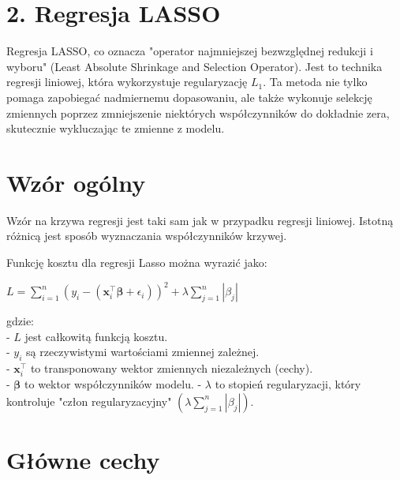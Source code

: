 {}
\justify
\fontsize{14}{16}\selectfont
\setlength{\parindent}{0pt}
\section*{2. Regresja LASSO \cite{alma991000280759708832}}
\fontsize{12}{14}\selectfont
\vspace{-1.0em}

Regresja LASSO, co oznacza "operator najmniejszej bezwzględnej redukcji i wyboru" (Least Absolute Shrinkage and Selection Operator). Jest to technika regresji liniowej, która wykorzystuje regularyzację $L_1$. Ta metoda nie tylko pomaga zapobiegać nadmiernemu dopasowaniu, ale także wykonuje selekcję zmiennych poprzez zmniejszenie niektórych współczynników do dokładnie zera, skutecznie wykluczając te zmienne z modelu.

{}
\section*{Wzór ogólny \cite{url_stochasticbard_lasso_regression}}
\vspace{-1.0em}


Wzór na krzywa regresji jest taki sam jak w przypadku regresji liniowej. Istotną różnicą jest sposób wyznaczania współczynników krzywej.

Funkcję kosztu dla regresji Lasso można wyrazić jako:
\begin{center}

$L = \sum_{i=1}^{n} (y_i - (\boldsymbol{x}_i^{\top} \boldsymbol{\beta} + \epsilon_i))^2 + \lambda \sum_{j=1}^{n} |\beta_j|$
\end{center}

gdzie: \\
- $L$ jest całkowitą funkcją kosztu.\\
- $y_i$ są rzeczywistymi wartościami zmiennej zależnej.\\
- $\boldsymbol{x}_i^{\top}$ to transponowany wektor zmiennych niezależnych (cechy).\\
- $\boldsymbol{\beta}$ to wektor współczynników modelu.
- $\lambda$ to stopień regularyzacji, który kontroluje "człon regularyzacyjny" $( \lambda \sum_{j=1}^{n} |\beta_j|)$.

{}
\section*{Główne cechy}
\vspace{-1.0em}


